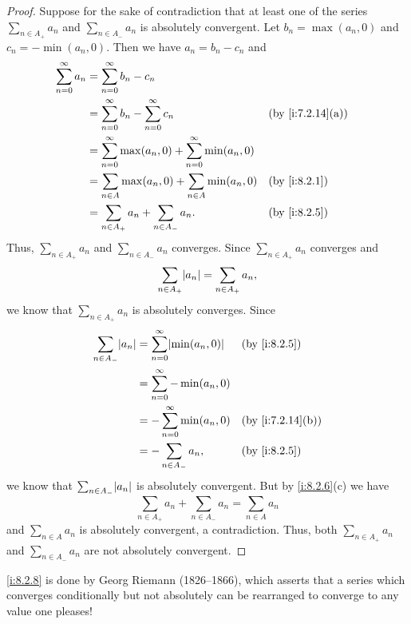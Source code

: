 \begin{proof}
  Suppose for the sake of contradiction that at least one of the series \(\sum_{n \in A_+} a_n\) and \(\sum_{n \in A_-} a_n\) is absolutely convergent.
  Let \(b_n = \max(a_n, 0)\) and \(c_n = -\min(a_n, 0)\).
  Then we have \(a_n = b_n - c_n\) and
  \begin{align*}
    \sum_{n = 0}^\infty a_n & = \sum_{n = 0}^\infty b_n - c_n                                                             \\
                            & = \sum_{n = 0}^\infty b_n - \sum_{n = 0}^\infty c_n                   &  & \by{i:7.2.14}[a] \\
                            & = \sum_{n = 0}^\infty \max(a_n, 0) + \sum_{n = 0}^\infty \min(a_n, 0)                       \\
                            & = \sum_{n \in A} \max(a_n, 0) + \sum_{n \in A} \min(a_n, 0)           &  & \by{i:8.2.1}     \\
                            & = \sum_{n \in A_+} a_n + \sum_{n \in A_-} a_n.                        &  & \by{i:8.2.5}
  \end{align*}
  Thus, \(\sum_{n \in A_+} a_n\) and \(\sum_{n \in A_-} a_n\) converges.
  Since \(\sum_{n \in A_+} a_n\) converges and
  \[
    \sum_{n \in A_+} \abs{a_n} = \sum_{n \in A_+} a_n,
  \]
  we know that \(\sum_{n \in A_+} a_n\) is absolutely converges.
  Since
  \begin{align*}
    \sum_{n \in A_-} \abs{a_n} & = \sum_{n = 0}^\infty \abs{\min(a_n, 0)} &  & \by{i:8.2.5}     \\
                               & = \sum_{n = 0}^\infty -\min(a_n, 0)                            \\
                               & = -\sum_{n = 0}^\infty \min(a_n, 0)      &  & \by{i:7.2.14}[b] \\
                               & = -\sum_{n \in A_-} a_n,                 &  & \by{i:8.2.5}
  \end{align*}
  we know that \(\sum_{n \in A_-} \abs{a_n}\) is absolutely convergent.
  But by \cref{i:8.2.6}(c) we have
  \[
    \sum_{n \in A_+} a_n + \sum_{n \in A_-} a_n = \sum_{n \in A} a_n
  \]
  and \(\sum_{n \in A} a_n\) is absolutely convergent, a contradiction.
  Thus, both \(\sum_{n \in A_+} a_n\) and \(\sum_{n \in A_-} a_n\) are not absolutely convergent.
\end{proof}

\begin{note}
  \cref{i:8.2.8} is done by Georg Riemann (1826--1866), which asserts that a series which converges conditionally but not absolutely can be rearranged to converge to any value one pleases!
\end{note}

